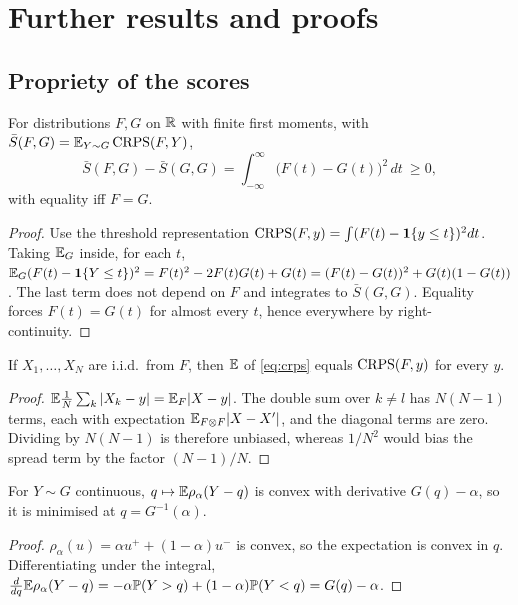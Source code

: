 \section{Further results and proofs}\label{app:proofs}

\subsection{Propriety of the scores}

\begin{proposition}\label{prop:crps-proper}
For distributions $F,G$ on $\mathbb{R}$ with finite first moments, with $\bar S(F,G)=\mathbb{E}_{Y\sim G}\operatorname{CRPS}(F,Y)$,
\begin{equation}
  \bar S(F,G)-\bar S(G,G)=\int_{-\infty}^{\infty}\bigl(F(t)-G(t)\bigr)^2\,dt\ \ge 0,
\end{equation}
with equality iff $F=G$.
\end{proposition}
\begin{proof}
Use the threshold representation $\operatorname{CRPS}(F,y)=\int(F(t)-\mathbf{1}\{y\le t\})^2dt$. Taking $\mathbb{E}_G$ inside, for each $t$,
$\mathbb{E}_G(F(t)-\mathbf{1}\{Y\le t\})^2=F(t)^2-2F(t)G(t)+G(t)=(F(t)-G(t))^2+G(t)(1-G(t))$. The last term does not depend on $F$ and integrates to
$\bar S(G,G)$. Equality forces $F(t)=G(t)$ for almost every $t$, hence everywhere by right-continuity.
\end{proof}

\begin{proposition}
If $X_1,\dots,X_N$ are i.i.d.\ from $F$, then $\mathbb{E}$ of \eqref{eq:crps} equals $\operatorname{CRPS}(F,y)$ for every $y$.
\end{proposition}
\begin{proof}
$\mathbb{E}\frac1N\sum_k|X_k-y|=\mathbb{E}_F|X-y|$. The double sum over $k\ne l$ has $N(N-1)$ terms, each with expectation $\mathbb{E}_{F\otimes F}|X-X'|$, and the
diagonal terms are zero. Dividing by $N(N-1)$ is therefore unbiased, whereas $1/N^2$ would bias the spread term by the factor $(N-1)/N$.
\end{proof}

\begin{proposition}
For $Y\sim G$ continuous, $q\mapsto\mathbb{E}\rho_\alpha(Y-q)$ is convex with derivative $G(q)-\alpha$, so it is minimised at $q=G^{-1}(\alpha)$.
\end{proposition}
\begin{proof}
$\rho_\alpha(u)=\alpha u^+ +(1-\alpha)u^-$ is convex, so the expectation is convex in $q$. Differentiating under the integral,
$\frac{d}{dq}\mathbb{E}\rho_\alpha(Y-q)=-\alpha\mathbb{P}(Y>q)+(1-\alpha)\mathbb{P}(Y<q)=G(q)-\alpha$.
\end{proof}


